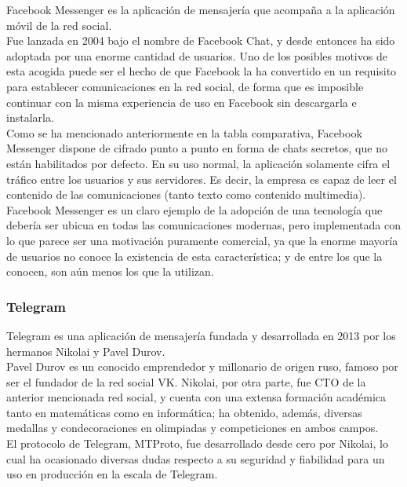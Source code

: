 Facebook Messenger es la aplicación de mensajería que acompaña a la aplicación móvil de la red social. \\

Fue lanzada en 2004 bajo el nombre de Facebook Chat, y desde entonces ha sido adoptada por una enorme cantidad de usuarios. Uno de los posibles motivos de esta acogida puede ser el hecho de que Facebook la ha convertido en un requisito para establecer comunicaciones en la red social, de forma que es imposible continuar con la misma experiencia de uso en Facebook sin descargarla e instalarla. \\

Como se ha mencionado anteriormente en la tabla comparativa, Facebook Messenger dispone de cifrado punto a punto en forma de chats secretos, que no están habilitados por defecto. En su uso normal, la aplicación solamente cifra el tráfico entre los usuarios y sus servidores. Es decir, la empresa es capaz de leer el contenido de las comunicaciones (tanto texto como contenido multimedia). \\

Facebook Messenger es un claro ejemplo de la adopción de una tecnología que debería ser ubicua en todas las comunicaciones modernas, pero implementada con lo que parece ser una motivación puramente comercial, ya que la enorme mayoría de usuarios no conoce la existencia de esta característica; y de entre los que la conocen, son aún menos los que la utilizan.

\subsubsection {Telegram}

Telegram es una aplicación de mensajería fundada y desarrollada en 2013 por los hermanos Nikolai y Pavel Durov. \\

Pavel Durov es un conocido emprendedor y millonario de origen ruso, famoso por ser el fundador de la red social VK. Nikolai, por otra parte, fue CTO de la anterior mencionada red social, y cuenta con una extensa formación académica tanto en matemáticas como en informática; ha obtenido, además, diversas medallas y condecoraciones en olimpiadas y competiciones en ambos campos. \\

El protocolo de Telegram, MTProto, fue desarrollado desde cero por Nikolai, lo cual ha ocasionado diversas dudas respecto a su seguridad y fiabilidad para un uso en producción en la escala de Telegram. \\

